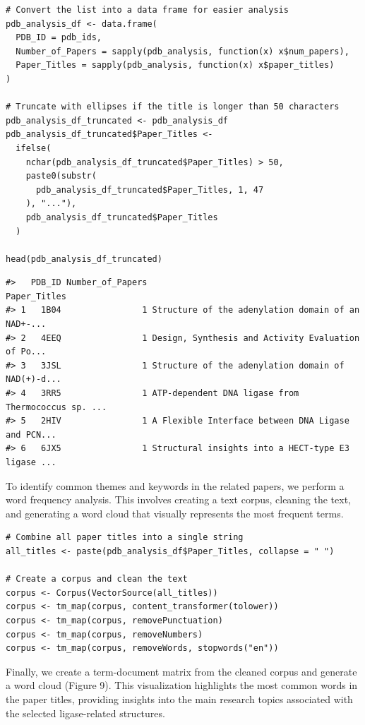 \begin{verbatim}
# Convert the list into a data frame for easier analysis
pdb_analysis_df <- data.frame(
  PDB_ID = pdb_ids,
  Number_of_Papers = sapply(pdb_analysis, function(x) x$num_papers),
  Paper_Titles = sapply(pdb_analysis, function(x) x$paper_titles)
)

# Truncate with ellipses if the title is longer than 50 characters
pdb_analysis_df_truncated <- pdb_analysis_df
pdb_analysis_df_truncated$Paper_Titles <-
  ifelse(
    nchar(pdb_analysis_df_truncated$Paper_Titles) > 50,
    paste0(substr(
      pdb_analysis_df_truncated$Paper_Titles, 1, 47
    ), "..."),
    pdb_analysis_df_truncated$Paper_Titles
  )

head(pdb_analysis_df_truncated)  
\end{verbatim}

\begin{verbatim}
#>   PDB_ID Number_of_Papers                                       Paper_Titles
#> 1   1B04                1 Structure of the adenylation domain of an NAD+-...
#> 2   4EEQ                1 Design, Synthesis and Activity Evaluation of Po...
#> 3   3JSL                1 Structure of the adenylation domain of NAD(+)-d...
#> 4   3RR5                1 ATP-dependent DNA ligase from Thermococcus sp. ...
#> 5   2HIV                1 A Flexible Interface between DNA Ligase and PCN...
#> 6   6JX5                1 Structural insights into a HECT-type E3 ligase ...
\end{verbatim}

To identify common themes and keywords in the related papers, we perform a word frequency analysis. This involves creating a text corpus, cleaning the text, and generating a word cloud that visually represents the most frequent terms.

\begin{verbatim}
# Combine all paper titles into a single string
all_titles <- paste(pdb_analysis_df$Paper_Titles, collapse = " ")

# Create a corpus and clean the text
corpus <- Corpus(VectorSource(all_titles))
corpus <- tm_map(corpus, content_transformer(tolower))
corpus <- tm_map(corpus, removePunctuation)
corpus <- tm_map(corpus, removeNumbers)
corpus <- tm_map(corpus, removeWords, stopwords("en"))
\end{verbatim}

Finally, we create a term-document matrix from the cleaned corpus and generate a word cloud (Figure 9). This visualization highlights the most common words in the paper titles, providing insights into the main research topics associated with the selected ligase-related structures.

